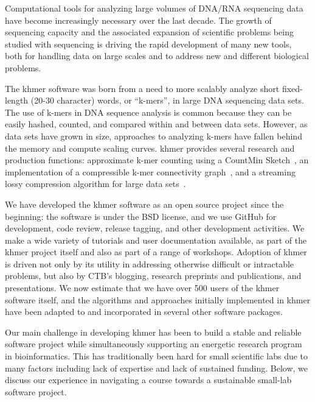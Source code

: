\documentclass[12pt]{article}
\begin{document}
Computational tools for analyzing large volumes of DNA/RNA sequencing data
have become increasingly necessary over the last decade.  The growth
of sequencing capacity and the associated expansion of scientific
problems being studied with sequencing is driving the rapid development of
many new tools, both for handling data on large scales and to address
new and different biological problems.

The khmer software was born from a need to more scalably analyze short
fixed-length (20-30 character) words, or ``k-mers'', in large DNA sequencing data
sets. The use of k-mers in DNA sequence analysis is common because
they can be easily hashed, counted, and compared within and between
data sets.  However, as data sets have grown in size, approaches to
analyzing k-mers have fallen behind the memory and compute scaling curves. 
khmer provides several research and production functions:
approximate k-mer counting using a CountMin Sketch~\cite{Zhang2013},
an implementation of a compressible k-mer connectivity graph~\cite{Pell2012},
and a streaming lossy compression algorithm for large data
sets~\cite{Brown2012}.

We have developed the khmer software as an open source project since
the beginning: the software is under the BSD license, and we use
GitHub for development, code review, release tagging, and other
development activities.  We make a wide variety of tutorials and
user documentation available, as part of the khmer project itself and
also as part of a range of workshops.  Adoption of khmer is driven not only by
its utility in addressing otherwise difficult or intractable problems,
but also by CTB's blogging, research preprints and publications, and
presentations.  We now estimate that we have over 500 users of the
khmer software itself, and the algorithms and approaches initially
implemented in khmer have been adapted to and incorporated in several other
software packages.

Our main challenge in developing khmer has been to build a stable and
reliable software project while simultaneously supporting an energetic
research program in bioinformatics.  This has traditionally been hard
for small scientific labs due to many factors including
lack of expertise and lack of sustained funding.  Below, we discuss
our experience in navigating a course towards a sustainable small-lab
software project.
\end{document}
